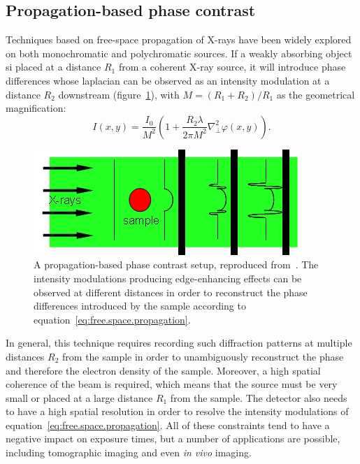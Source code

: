 \subsection{Propagation-based phase contrast}
Techniques based on free-space propagation of X-rays have been widely
explored on both monochromatic and polychromatic sources. If a weakly
absorbing object si placed at a distance $R_1$ from a coherent X-ray source,
it will introduce phase differences whose laplacian can be observed as an
intensity modulation at a distance $R_2$ downstream (figure~\ref{fig:propagation.based}), with
$M = (R_1 + R_2) / R_1$ as the geometrical magnification:
\begin{equation}
    I(x, y) = \frac{I_0}{M^2}\left(1 + \frac{R_2\lambda}{2\pi M^2}\nabla_\perp^2
    \varphi(x, y)\right).
    \label{eq:free.space.propagation}
\end{equation}

\begin{figure}[htb]
    \centering
    \includegraphics[width=.6\textwidth]{gfx/propagation-based_imaging.png}
    \caption[Propagation-based setup.]{A propagation-based phase contrast
        setup, reproduced from~\cite{propagation-based-picture}. The intensity modulations producing edge-enhancing effects can
be observed at different distances in order to reconstruct the phase
differences introduced by the sample according to
equation~\eqref{eq:free.space.propagation}.}
    \label{fig:propagation.based}
\end{figure}

In general, this technique requires recording such diffraction patterns at
multiple distances $R_2$ from the sample in order to unambiguously
reconstruct the phase and therefore the electron density of the sample.
Moreover, a high spatial coherence of the beam is required, which means
that the source must be very small or placed at a large distance $R_1$ from
the sample. The detector also needs to have a high spatial resolution in
order to resolve the intensity modulations of
equation~\eqref{eq:free.space.propagation}. All of these constraints tend to
have a negative impact on exposure times, but a number of applications are
possible, including tomographic imaging and even \emph{in vivo} imaging.

